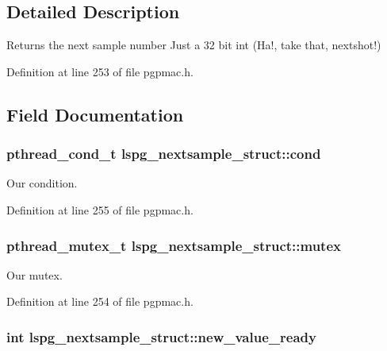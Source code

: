 \subsection{Detailed Description}
Returns the next sample number Just a 32 bit int (Ha!, take that, nextshot!) 

Definition at line 253 of file pgpmac.\-h.



\subsection{Field Documentation}
\hypertarget{structlspg__nextsample__struct_a5b46e4537dac3be839f6c3eeff6b46b6}{
\subsubsection[{cond}]{\setlength{\rightskip}{0pt plus 5cm}pthread\-\_\-cond\-\_\-t lspg\-\_\-nextsample\-\_\-struct\-::cond}}\label{structlspg__nextsample__struct_a5b46e4537dac3be839f6c3eeff6b46b6}


Our condition. 



Definition at line 255 of file pgpmac.\-h.

\hypertarget{structlspg__nextsample__struct_a99408b5825e2510f07be199d2cdc3633}{
\subsubsection[{mutex}]{\setlength{\rightskip}{0pt plus 5cm}pthread\-\_\-mutex\-\_\-t lspg\-\_\-nextsample\-\_\-struct\-::mutex}}\label{structlspg__nextsample__struct_a99408b5825e2510f07be199d2cdc3633}


Our mutex. 



Definition at line 254 of file pgpmac.\-h.

\hypertarget{structlspg__nextsample__struct_ab1c9e9d3dc5140137a7ccf908e95f69e}{
\subsubsection[{new\-\_\-value\-\_\-ready}]{\setlength{\rightskip}{0pt plus 5cm}int lspg\-\_\-nextsample\-\_\-struct\-::new\-\_\-value\-\_\-ready}}\label{structlspg__nextsample__struct_ab1c9e9d3dc5140137a7ccf908e95f69e}


